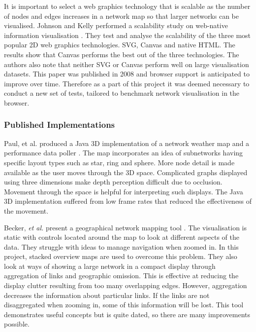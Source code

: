 \documentclass[11pt, a4paper]{article}
\begin{document}
It is important to select a web graphics technology that is scalable as the
number of nodes and edges increases in a network map so that larger networks can
be visualised. Johnson and Kelly performed a scalability study on web-native
information visualisation \cite{Johnson_2008}.  They test and analyse the
scalability of the three most popular 2D web graphics technologies.  SVG, Canvas
and native HTML. The results show that Canvas performs the best out of the three
technologies. The authors also note that neither SVG or Canvas perform well on
large visualisation datasets. This paper was published in 2008 and browser
support is anticipated to improve over time. Therefore as a part of this project
it was deemed necessary to conduct a new set of tests, tailored to benchmark
network visualisation in the browser.



\subsubsection{Published Implementations}
\label{sec:published-implementations}

Paul, et al. produced a Java 3D implementation of a network weather map and a
performance data poller \cite{Paul_2000}. The map incorporates an idea of
subnetworks having specific layout types such as star, ring and sphere. More
node detail is made available as the user moves through the 3D space.
Complicated graphs displayed using three dimensions make depth perception
difficult due to occlusion. Movement through the space is helpful for
interpreting such displays. The Java 3D implementation suffered from low frame
rates that reduced the effectiveness of the movement.


Becker, \emph{et al.} present a geographical network mapping tool \cite{Becker_1995}.
The visualisation is static with controls located around the map to look at
different aspects of the data. They struggle with ideas to manage navigation
when zoomed in. In this project, stacked overview maps are used to overcome this
problem. They also look at ways of showing a large network in a compact display
through aggregation of links and geographic omission. This is effective at
reducing the display clutter resulting from too many overlapping edges. However,
aggregation decreases the information about particular links. If the links are
not disaggregated when zooming in, some of this information will be lost. This
tool demonstrates useful concepts but is quite dated, so there are many
improvements possible.
\end{document}

